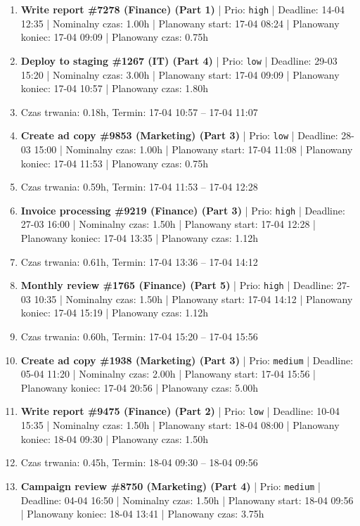 {\begin{enumerate}
  \item [\textbf{14609}] \textbf{Write report \#7278 (Finance) (Part 1)} | Prio: \texttt{high} | Deadline: 14-04 12:35 | Nominalny czas: 1.00h | Planowany start: 17-04 08:24 | Planowany koniec: 17-04 09:09 | Planowany czas: 0.75h
  \item [\textbf{14686}] \textbf{Deploy to staging \#1267 (IT) (Part 4)} | Prio: \texttt{low} | Deadline: 29-03 15:20 | Nominalny czas: 3.00h | Planowany start: 17-04 09:09 | Planowany koniec: 17-04 10:57 | Planowany czas: 1.80h
  \item [\textbf{PRZERWA}] Czas trwania: 0.18h, Termin: 17-04 10:57 -- 17-04 11:07
  \item [\textbf{14679}] \textbf{Create ad copy \#9853 (Marketing) (Part 3)} | Prio: \texttt{low} | Deadline: 28-03 15:00 | Nominalny czas: 1.00h | Planowany start: 17-04 11:08 | Planowany koniec: 17-04 11:53 | Planowany czas: 0.75h
  \item [\textbf{PRZERWA}] Czas trwania: 0.59h, Termin: 17-04 11:53 -- 17-04 12:28
  \item [\textbf{14622}] \textbf{Invoice processing \#9219 (Finance) (Part 3)} | Prio: \texttt{high} | Deadline: 27-03 16:00 | Nominalny czas: 1.50h | Planowany start: 17-04 12:28 | Planowany koniec: 17-04 13:35 | Planowany czas: 1.12h
  \item [\textbf{PRZERWA}] Czas trwania: 0.61h, Termin: 17-04 13:36 -- 17-04 14:12
  \item [\textbf{14627}] \textbf{Monthly review \#1765 (Finance) (Part 5)} | Prio: \texttt{high} | Deadline: 27-03 10:35 | Nominalny czas: 1.50h | Planowany start: 17-04 14:12 | Planowany koniec: 17-04 15:19 | Planowany czas: 1.12h
  \item [\textbf{PRZERWA}] Czas trwania: 0.60h, Termin: 17-04 15:20 -- 17-04 15:56
  \item [\textbf{14652}] \textbf{Create ad copy \#1938 (Marketing) (Part 3)} | Prio: \texttt{medium} | Deadline: 05-04 11:20 | Nominalny czas: 2.00h | Planowany start: 17-04 15:56 | Planowany koniec: 17-04 20:56 | Planowany czas: 5.00h
  \item [\textbf{14685}] \textbf{Write report \#9475 (Finance) (Part 2)} | Prio: \texttt{low} | Deadline: 10-04 15:35 | Nominalny czas: 1.50h | Planowany start: 18-04 08:00 | Planowany koniec: 18-04 09:30 | Planowany czas: 1.50h
  \item [\textbf{PRZERWA}] Czas trwania: 0.45h, Termin: 18-04 09:30 -- 18-04 09:56
  \item [\textbf{14632}] \textbf{Campaign review \#8750 (Marketing) (Part 4)} | Prio: \texttt{medium} | Deadline: 04-04 16:50 | Nominalny czas: 1.50h | Planowany start: 18-04 09:56 | Planowany koniec: 18-04 13:41 | Planowany czas: 3.75h

\end{enumerate}}
